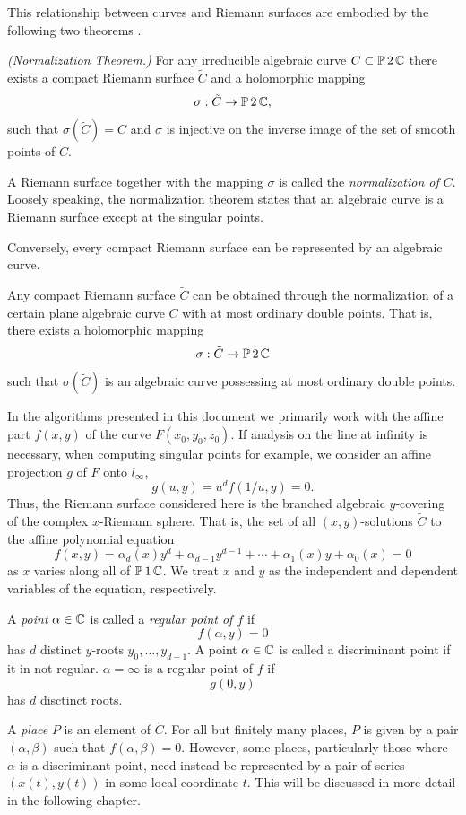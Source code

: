 This relationship between curves and Riemann surfaces are embodied by
the following two theorems \cite{Griffiths89}.

\begin{theorem} \label{thm: normalization}
  {\it (Normalization Theorem.)} For any irreducible algebraic curve $C
  \subset \operatorname{\mathbb{P}}{2}\operatorname{\mathbb{C}}$ there exists a compact Riemann surface $\tilde{C}$ and
  a holomorphic mapping
  \[
      \sigma : \tilde{C} \to \operatorname{\mathbb{P}}{2}\operatorname{\mathbb{C}},
  \]
  such that $\sigma( \tilde{C} ) = C$ and $\sigma$ is injective on the
  inverse image of the set of smooth points of $C$.
\end{theorem}

A Riemann surface together with the mapping $\sigma$ is called the {\it
  normalization of $C$}. Loosely speaking, the normalization theorem
states that an algebraic curve is a Riemann surface except at the
singular points.

Conversely, every compact Riemann surface can be represented by an
algebraic curve.

\begin{theorem} \label{thm: repr-theorem}
  Any compact Riemann surface $\tilde{C}$ can be obtained through the
  normalization of a certain plane algebraic curve $C$ with at most
  ordinary double points. That is, there exists a holomorphic mapping
  \[
      \sigma : \tilde{C} \to \operatorname{\mathbb{P}}{2}\operatorname{\mathbb{C}}
  \]
  such that $\sigma(\tilde{C})$ is an algebraic curve possessing at most
  ordinary double points.
\end{theorem}

In the algorithms presented in this document we primarily work with the
affine part $f(x,y)$ of the curve $F(x_0,y_0,z_0)$. If analysis on the
line at infinity is necessary, when computing singular points for
example, we consider an affine projection $g$ of $F$ onto $l_\infty$,
\[
    g(u,y) = u^d f(1/u,y) = 0.
\]
Thus, the Riemann surface considered here is the branched algebraic
$y$-covering of the complex $x$-Riemann sphere. That is, the set of all
$(x,y)$-solutions $\tilde{C}$ to the affine polynomial equation
\[
    f(x,y) = \alpha_d(x)y^d + \alpha_{d-1}y^{d-1} + \cdots +
             \alpha_1(x)y + \alpha_0(x) = 0
\]
as $x$ varies along all of $\operatorname{\mathbb{P}}{1}\operatorname{\mathbb{C}}$. We treat $x$ and $y$ as the
independent and dependent variables of the equation, respectively.

A {\it point} $\alpha \in \operatorname{\mathbb{C}}$ is called a {\it regular point of $f$} if
\[
    f(\alpha,y) = 0
\]
has $d$ distinct $y$-roots $y_0,\ldots,y_{d-1}$. A point $\alpha \in
\operatorname{\mathbb{C}}$ is called a discriminant point if it in not regular. $\alpha =
\infty$ is a regular point of $f$ if
\[
    g(0,y)
\]
has $d$ disctinct roots.

A {\it place} $P$ is an element of $\tilde{C}$. For all but finitely
many places, $P$ is given by a pair $(\alpha,\beta)$ such that
$f(\alpha,\beta) = 0$. However, some places, particularly those where
$\alpha$ is a discriminant point, need instead be represented by a pair
of series $(x(t),y(t))$ in some local coordinate $t$. This will be
discussed in more detail in the following chapter.
